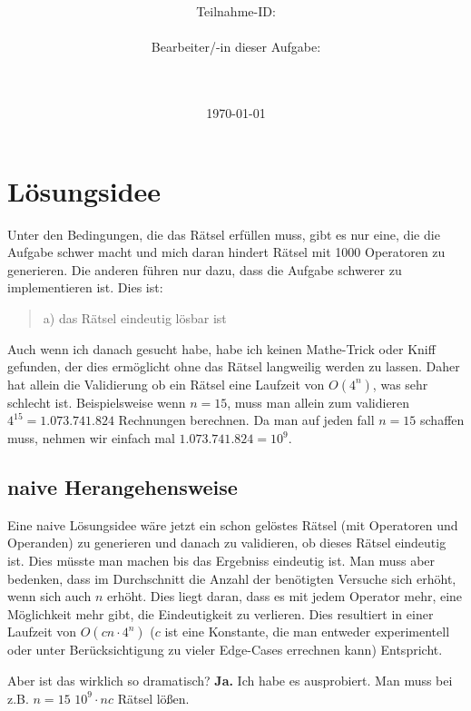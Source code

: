 \documentclass[a4paper,10pt,ngerman]{scrartcl}
\title{\textbf{\Huge\Aufgabe}}
\author{\LARGE Teilnahme-ID: \LARGE \TeilnahmeId \\\\
	    \LARGE Bearbeiter/-in dieser Aufgabe: \\ 
	    \LARGE \Name\\\\}
\date{\LARGE\today}
\begin{document}
\maketitle

\setcounter{tocdepth}{3}
\tableofcontents

\vspace{0.5cm}

\section{Lösungsidee}

Unter den Bedingungen, die das Rätsel erfüllen muss, gibt es nur eine, die die Aufgabe schwer macht und mich daran hindert Rätsel mit 1000 Operatoren zu generieren. Die anderen führen nur dazu, dass die Aufgabe schwerer zu implementieren ist. Dies ist:
\begin{quote}
a) das Rätsel eindeutig lösbar ist
\end{quote}

Auch wenn ich danach gesucht habe, habe ich keinen Mathe-Trick oder Kniff gefunden, der dies ermöglicht ohne das Rätsel langweilig werden zu lassen. Daher hat allein die Validierung ob ein Rätsel eine Laufzeit von $O(4^n)$, was sehr schlecht ist. Beispielsweise wenn $n=15$, muss man allein zum validieren $4^15=1.073.741.824$ Rechnungen berechnen. Da man auf jeden fall $n=15$ schaffen muss, nehmen wir einfach mal $1.073.741.824=10^9$.

\subsection{naive Herangehensweise}

Eine naive Lösungsidee wäre jetzt ein schon gelöstes Rätsel (mit Operatoren und Operanden) zu generieren und danach zu validieren, ob dieses Rätsel eindeutig ist. Dies müsste man machen bis das Ergebniss eindeutig ist. Man muss aber bedenken, dass im Durchschnitt die Anzahl der benötigten Versuche sich erhöht, wenn sich auch $n$ erhöht. Dies liegt daran, dass es mit jedem Operator mehr, eine Möglichkeit mehr gibt, die Eindeutigkeit zu verlieren. Dies resultiert in einer Laufzeit von $O(cn \cdot 4^n)$ ($c$ ist eine Konstante, die man entweder experimentell oder unter Berücksichtigung zu vieler Edge-Cases errechnen kann) Entspricht.

Aber ist das wirklich so dramatisch? \textbf{Ja.} Ich habe es ausprobiert. Man muss bei z.B. $n=15$ $10^9 \cdot nc$ Rätsel lößen.
\end{document}
